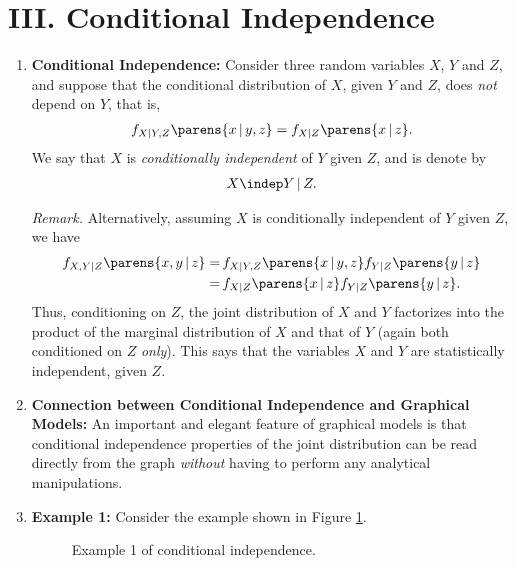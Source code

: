 \documentclass[12pt]{article}
\begin{document}
\section*{III. Conditional Independence}

\begin{enumerate}[label=\textbf{\arabic*.}]

	\item \textbf{Conditional Independence:} Consider three random variables $X$, $Y$ and $Z$, and suppose that the conditional distribution of $X$, given $Y$ and $Z$, does \emph{not} depend on $Y$, that is, 
	\begin{align}
		f_{X \vert Y, Z} \parens{x \,\vert\, y, z} = f_{X \vert Z} \parens{x \,\vert\, z}. 
	\end{align}
	We say that $X$ is \emph{conditionally independent} of $Y$ given $Z$, and is denote by 
	\begin{align}
		X \indep Y \,\vert\, Z. 
	\end{align}
	
	\textit{Remark.} Alternatively, assuming $X$ is conditionally independent of $Y$ given $Z$, we have 
	\begin{align*}
		f_{X, Y \vert Z} \parens{x, y \,\vert\, z} = & \, f_{X \vert Y, Z} \parens{x \,\vert\, y, z} f_{Y \vert Z} \parens{y \,\vert\, z} \\ 
		= & \, f_{X \vert Z} \parens{x \,\vert\, z} f_{Y \vert Z} \parens{y \,\vert\, z}. 
	\end{align*}
	Thus, conditioning on $Z$, the joint distribution of $X$ and $Y$ factorizes into the product of the marginal distribution of $X$ and that of $Y$ (again both conditioned on $Z$ \emph{only}). This says that the variables $X$ and $Y$ are statistically independent, given $Z$. 
	
	\item \textbf{Connection between Conditional Independence and Graphical Models:} An important and elegant feature of graphical models is that conditional independence properties of the joint distribution can be read directly from the graph \emph{without} having to perform any analytical manipulations. 
	
	\item \textbf{Example 1:} Consider the example shown in Figure \ref{fig-conditional-indep-1}. 
	
	\begin{figure}[h]
		\centering
		\captionsetup{width=.7\linewidth}
		\caption{Example 1 of conditional independence.}
		\label{fig-conditional-indep-1}
	\end{figure}
	

\end{enumerate}
\end{document}
